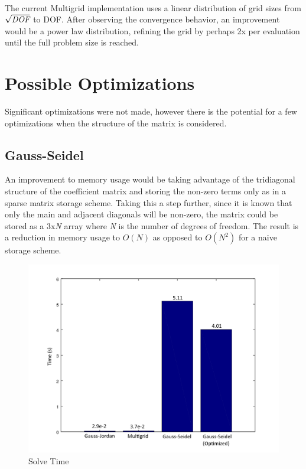 \documentclass[12pt,twocolumn]{article}
\begin{document}
\paragraph{}The current Multigrid implementation uses a linear distribution of grid sizes from $\sqrt{\emph{DOF}}$ to DOF. 
After observing the convergence behavior, an improvement would be a power law distribution, refining the grid by perhaps 2x per evaluation until the full problem size is reached.
\section*{Possible Optimizations}
Significant optimizations were not made, however there is the potential for a few optimizations when the structure of the matrix is considered.
\subsection*{Gauss-Seidel}
An improvement to memory usage would be taking advantage of the tridiagonal structure of the coefficient matrix and
storing the non-zero terms only as in a sparse matrix storage scheme. Taking this a step further, since it is known that only the main
and adjacent diagonals will be non-zero, the matrix could be stored as a 3x\emph{N} array where \emph{N} is the number of 
degrees of freedom. The result is a reduction in memory usage to $O(N)$ as opposed to $O(N^2)$ for a naive storage scheme.
\begin{figure}
\includegraphics[width=\columnwidth]{bench.png}
\footnotesize{\caption{Solve Time}}
\end{figure}
\end{document}
